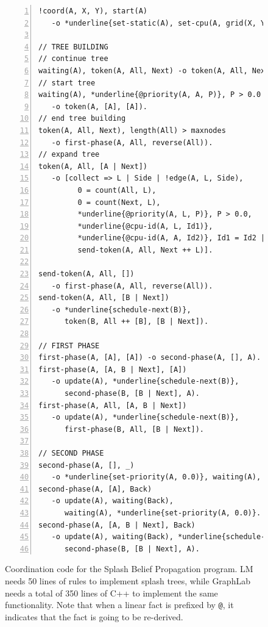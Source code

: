 \begin{figure}[h!]
\scriptsize\begin{Verbatim}[numbers=left,commandchars=*\{\}]
!coord(A, X, Y), start(A)
   -o *underline{set-static(A), set-cpu(A, grid(X, Y))}.

// TREE BUILDING
// continue tree
waiting(A), token(A, All, Next) -o token(A, All, Next).
// start tree
waiting(A), *underline{@priority(A, A, P)}, P > 0.0
   -o token(A, [A], [A]).
// end tree building
token(A, All, Next), length(All) > maxnodes
   -o first-phase(A, All, reverse(All)).
// expand tree
token(A, All, [A | Next])
   -o [collect => L | Side | !edge(A, L, Side),
         0 = count(All, L),
         0 = count(Next, L),
         *underline{@priority(A, L, P)}, P > 0.0,
         *underline{@cpu-id(A, L, Id1)},
         *underline{@cpu-id(A, A, Id2)}, Id1 = Id2 |
         send-token(A, All, Next ++ L)].

send-token(A, All, [])
   -o first-phase(A, All, reverse(All)).
send-token(A, All, [B | Next])
   -o *underline{schedule-next(B)},
      token(B, All ++ [B], [B | Next]).

// FIRST PHASE
first-phase(A, [A], [A]) -o second-phase(A, [], A).
first-phase(A, [A, B | Next], [A])
   -o update(A), *underline{schedule-next(B)},
      second-phase(B, [B | Next], A).
first-phase(A, All, [A, B | Next])
   -o update(A), *underline{schedule-next(B)},
      first-phase(B, All, [B | Next]).

// SECOND PHASE
second-phase(A, [], _)
   -o *underline{set-priority(A, 0.0)}, waiting(A), update(A).
second-phase(A, [A], Back)
   -o update(A), waiting(Back),
      waiting(A), *underline{set-priority(A, 0.0)}.
second-phase(A, [A, B | Next], Back)
   -o update(A), waiting(Back), *underline{schedule-next(B)},
      second-phase(B, [B | Next], A).
\end{Verbatim}
  \caption{Coordination code for the Splash Belief Propagation program. LM needs
     50 lines of rules to implement splash trees, while GraphLab needs a
     total of 350 lines of C++ to implement the same functionality.  Note
     that when a linear fact is prefixed by \texttt{@}, it indicates that the
     fact is going to be re-derived.}
  \label{code:sbp}
\end{figure}
\normalsize

